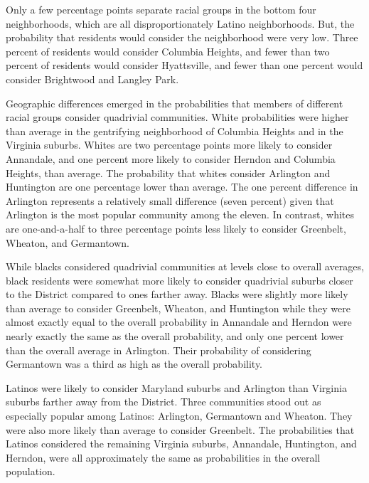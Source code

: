 \documentclass[11pt]{baderart}
\begin{document}

Only a few percentage points separate racial groups in the bottom four neighborhoods, which are all disproportionately Latino neighborhoods. But, the probability that residents would consider the neighborhood were very low. Three percent of residents would consider Columbia Heights, and fewer than two percent of residents would consider Hyattsville, and fewer than one percent would consider Brightwood and Langley Park. 

Geographic differences emerged in the probabilities that members of different racial groups consider quadrivial communities. White probabilities were higher than average in the gentrifying neighborhood of Columbia Heights and in the Virginia suburbs. Whites are two percentage points more likely to consider Annandale, and one percent more likely to consider Herndon and Columbia Heights, than average. The probability that whites consider Arlington and Huntington are one percentage lower than average. The one percent difference in Arlington represents a relatively small difference (seven percent) given that Arlington is the most popular community among the eleven. In contrast, whites are one-and-a-half to three percentage points less likely to consider Greenbelt, Wheaton, and Germantown. 

While blacks considered quadrivial communities at levels close to overall averages, black residents were somewhat more likely to consider quadrivial suburbs closer to the District compared to ones farther away. Blacks were slightly more likely than average to consider Greenbelt, Wheaton, and Huntington while they were almost exactly equal to the overall probability in Annandale and Herndon were nearly exactly the same as the overall probability, and only one percent lower than the overall average in Arlington. Their probability of considering Germantown was a third as high as the overall probability. 

Latinos were likely to consider Maryland suburbs and Arlington than Virginia suburbs farther away from the District. Three communities stood out as especially popular among Latinos: Arlington, Germantown and Wheaton. They were also more likely than average to consider Greenbelt. The probabilities that Latinos considered the remaining Virginia suburbs, Annandale, Huntington, and Herndon, were all approximately the same as probabilities in the overall population. 
\end{document}
